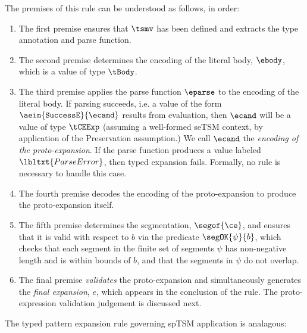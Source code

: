 \documentclass[acmlarge,review,anonymous]{acmart}\settopmatter{printfolios=true}
\begin{document}
The premises of this rule can be understood as follows, in order:
\begin{enumerate}
\item The first premise ensures that $\tsmv$ has been defined and extracts the type annotation and parse function.
\item The second premise determines the encoding of the literal body, $\ebody$, which is a value of type $\tBody$.
\item The third premise applies the parse function $\eparse$ to the encoding of the literal body. If parsing succeeds, i.e. a value of the form $\aein{\mathtt{SuccessE}}{\ecand}$ results from evaluation, then $\ecand$ will be a value of type $\tCEExp$ (assuming a well-formed seTSM context, by application of the Preservation assumption.) We call $\ecand$ the \emph{encoding of the proto-expansion}. If the parse function produces a value labeled $\lbltxt{ParseError}$, then typed expansion fails. Formally, no rule is necessary to handle this case. 

\item The fourth premise decodes the encoding of the proto-expansion to produce the {proto-expansion} itself.

\item The fifth premise determines the segmentation, $\segof{\ce}$, and ensures that it is valid with respect to $b$ via the predicate $\segOK{\psi}{b}$, which  checks that each segment in the finite set of segments $\psi$ has non-negative length and is within bounds of $b$, and that the segments in $\psi$ do not overlap.

\item The final premise \emph{validates} the proto-expansion and simultaneously generates the \emph{final expansion}, $e$, which appears in the conclusion of the rule. The proto-expression validation judgement is discussed next.
\end{enumerate}

The typed pattern expansion rule governing spTSM application is analagous:
\begin{mathpar}
\end{mathpar}
\end{document}
